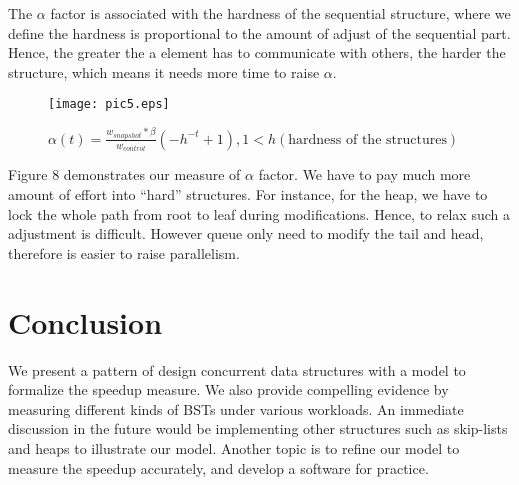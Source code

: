 \documentclass{article}
\begin{document}
The $\alpha$ factor is associated with the hardness of the sequential structure, where we define the hardness is proportional to the amount of adjust of the sequential part. Hence, the greater the a element has to communicate with others, the harder the structure, which means it needs more time to raise $\alpha$.
\begin{figure}
\centering
\texttt{[image: pic5.eps]}
\caption{
$
\alpha(t) = \frac{w_{snapshot} * \beta}{w_{control}}(-h^{-t}+1), 1 < h (\text{hardness of the structures})$
}
\label{fig:my_label8}
\end{figure}
Figure 8 demonstrates our measure of $\alpha$ factor. We have to pay much more amount of effort into ``hard'' structures. For instance, for the heap, we have to lock the whole path from root to leaf during modifications. Hence, to relax such a adjustment is difficult. However queue only need to modify the tail and head, therefore is easier to raise parallelism. 
\section{Conclusion}
We present a pattern of design concurrent data structures with a model to formalize the speedup measure. We also provide compelling evidence by measuring different kinds of BSTs under various workloads. An immediate discussion in the future would be implementing other structures such as skip-lists and heaps to illustrate our model. Another topic is to refine our model to measure the speedup accurately, and develop a software for practice. 



\end{document}
